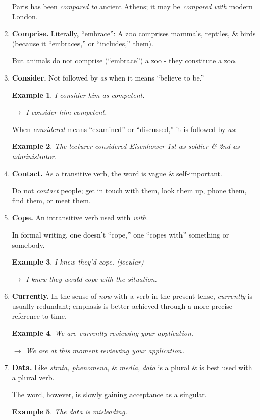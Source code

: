 \documentclass{article}
\newtheorem{example}{Example}
\begin{document}
\begin{enumerate}
	Paris has been {\it compared to} ancient Athens; it may be {\it compared with} modern London.
	\item {\bf Comprise.} Literally, ``embrace'': A zoo comprises mammals, reptiles, \& birds (because it ``embraces,'' or ``includes,'' them).
	
	But animals do not comprise (``embrace'') a zoo - they constitute a zoo.
	\item {\bf Consider.} Not followed by {\it as} when it means ``believe to be.''
	\begin{example}
		I consider him as competent.
		
		$\to$ I consider him competent.
	\end{example}
	When {\it considered} means ``examined'' or ``discussed,'' it is followed by {\it as}:
	\begin{example}
		The lecturer considered Eisenhower 1st as soldier \& 2nd as administrator.
	\end{example}
	\item {\bf Contact.} As a transitive verb, the word is vague \& self-important.
	
	Do not {\it contact} people; get in touch with them, look them up, phone them, find them, or meet them.
	\item {\bf Cope.} An intransitive verb used with {\it with}.
	
	In formal writing, one doesn't ``cope,'' one ``copes with'' something or somebody.
	\begin{example}
		I knew they'd cope. (jocular)
		
		$\to$ I knew they would cope with the situation.
	\end{example}
	\item {\bf Currently.} In the sense of {\it now} with a verb in the present tense, {\it currently} is usually redundant; emphasis is better achieved through a more precise reference to time.
	\begin{example}
		We are currently reviewing your application.
		
		$\to$ We are at this moment reviewing your application.
	\end{example}
	\item {\bf Data.} Like {\it strata, phenomena}, \& {\it media}, {\it data} is a plural \& is best used with a plural verb.
	
	The word, however, is slowly gaining acceptance as a singular.
	\begin{example}
		The data is misleading.
		

\end{example}
\end{enumerate}
\end{document}
